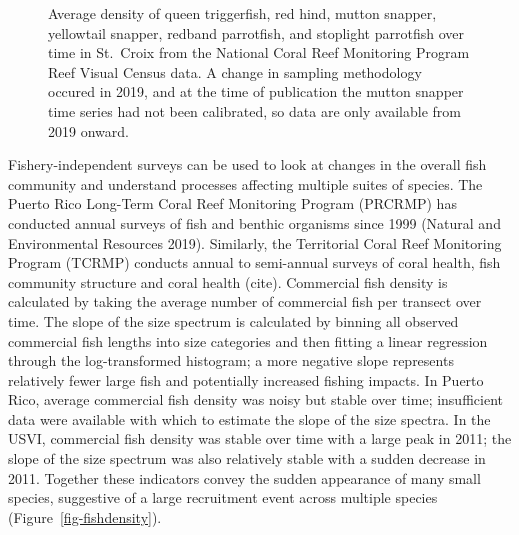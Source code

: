 \documentclass[
  letterpaper,
  oneside,
  open=any]{scrbook}
\begin{document}
\begin{figure}


\caption{\label{fig-RVCSTX}Average density of queen triggerfish, red
hind, mutton snapper, yellowtail snapper, redband parrotfish, and
stoplight parrotfish over time in St.~Croix from the National Coral Reef
Monitoring Program Reef Visual Census data. A change in sampling
methodology occured in 2019, and at the time of publication the mutton
snapper time series had not been calibrated, so data are only available
from 2019 onward.}

\end{figure}%

Fishery-independent surveys can be used to look at changes in the
overall fish community and understand processes affecting multiple
suites of species. The Puerto Rico Long-Term Coral Reef Monitoring
Program (PRCRMP) has conducted annual surveys of fish and benthic
organisms since 1999 (Natural and Environmental Resources 2019).
Similarly, the Territorial Coral Reef Monitoring Program (TCRMP)
conducts annual to semi-annual surveys of coral health, fish community
structure and coral health (cite). Commercial fish density is calculated
by taking the average number of commercial fish per transect over time.
The slope of the size spectrum is calculated by binning all observed
commercial fish lengths into size categories and then fitting a linear
regression through the log-transformed histogram; a more negative slope
represents relatively fewer large fish and potentially increased fishing
impacts. In Puerto Rico, average commercial fish density was noisy but
stable over time; insufficient data were available with which to
estimate the slope of the size spectra. In the USVI, commercial fish
density was stable over time with a large peak in 2011; the slope of the
size spectrum was also relatively stable with a sudden decrease in 2011.
Together these indicators convey the sudden appearance of many small
species, suggestive of a large recruitment event across multiple species
(Figure~\ref{fig-fishdensity}).
\end{document}
